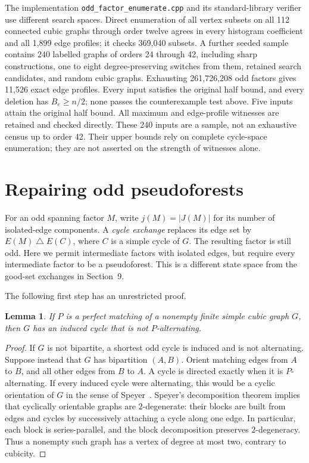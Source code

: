 \documentclass[11pt]{article}
\newtheorem{lemma}[theorem]{Lemma}
\begin{document}
The implementation \texttt{odd\_factor\_enumerate.cpp} and its
standard-library verifier use different search spaces. Direct
enumeration of all vertex subsets on all 112 connected cubic graphs
through order twelve agrees in every histogram coefficient and all
1,899 edge profiles; it checks 369,040 subsets. A further seeded
sample contains 240 labelled graphs of orders 24 through 42, including
sharp constructions, one to eight degree-preserving switches from
them, retained search candidates, and random cubic graphs. Exhausting
261,726,208 odd factors gives 11,526 exact edge profiles. Every input
satisfies the original half bound, and every deletion has $B_e\geq n/2$;
none passes the counterexample test above. Five inputs attain the
original half bound. All maximum and edge-profile witnesses are
retained and checked directly. These 240 inputs are a sample, not an
exhaustive census up to order 42. Their upper bounds rely on complete
cycle-space enumeration; they are not asserted on the strength of
witnesses alone.

\section{Repairing odd pseudoforests}
For an odd spanning factor $M$, write $j(M)=|J(M)|$ for its number
of isolated-edge components. A \emph{cycle exchange} replaces its
edge set by $E(M)\mathbin{\triangle}E(C)$, where $C$ is a simple
cycle of $G$. The resulting factor is still odd. Here we permit
intermediate factors with isolated edges, but require every
intermediate factor to be a pseudoforest. This is a different
state space from the good-set exchanges in Section~9.

The following first step has an unrestricted proof.

\begin{lemma}\label{lem:nonalternating}
If $P$ is a perfect matching of a nonempty finite simple cubic graph $G$,
then $G$ has an induced cycle that is not $P$-alternating.
\end{lemma}
\begin{proof}
If $G$ is not bipartite, a shortest odd cycle is induced and is
not alternating. Suppose instead that $G$ has bipartition $(A,B)$.
Orient matching edges from $A$ to $B$, and all other edges from
$B$ to $A$. A cycle is directed exactly when it is $P$-alternating.
If every induced cycle were alternating, this would be a cyclic
orientation of $G$ in the sense of Speyer~\cite{Speyer}.
Speyer's decomposition theorem implies that cyclically orientable
graphs are $2$-degenerate: their blocks are built from edges and
cycles by successively attaching a cycle along one edge.
In particular, each block is series-parallel, and the block
decomposition preserves $2$-degeneracy. Thus a nonempty such graph
has a vertex of degree at most two, contrary to cubicity.
\end{proof}
\end{document}
